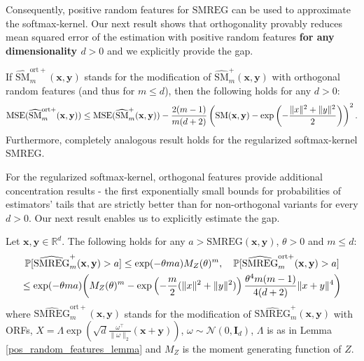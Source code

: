 Consequently, positive random features for $\mathrm{SMREG}$ can be used to approximate the softmax-kernel. Our next result shows that orthogonality provably reduces mean squared error of the estimation with positive random features \textbf{for any dimensionality $d>0$} and we explicitly provide the gap.

\begin{theorem}
\label{var-theorem}
If $\widehat{\mathrm{SM}}_{m}^{\mathrm{ort+}}(\mathbf{x}, \mathbf{y})$ stands for the modification of
$\widehat{\mathrm{SM}}_{m}^{+}(\mathbf{x}, \mathbf{y})$ with orthogonal random features (and thus for $m \leq d$), then the following holds for any $d >0$:
\begin{equation}
\mathrm{MSE}(\widehat{\mathrm{SM}}_{m}^{\mathrm{ort+}}(\mathbf{x}, \mathbf{y})) \leq 
\mathrm{MSE}(\widehat{\mathrm{SM}}_{m}^{+}(\mathbf{x}, \mathbf{y})) - \frac{2 (m - 1)}{m(d+2)}\left(\mathrm{SM}(\mathbf{x}, \mathbf{y}) - \exp\left(- \frac{\| \*x \|^2 + \| \*y \|^2}{2}\right) \right)^2.
\end{equation}
Furthermore, completely analogous result holds for the regularized softmax-kernel $\mathrm{SMREG}$.
\end{theorem}

For the regularized softmax-kernel, orthogonal features provide additional concentration results - the first exponentially small bounds for probabilities of estimators' tails that are strictly better than for non-orthogonal variants for every $d>0$. Our next result enables us to explicitly estimate the gap.

\begin{theorem}
\label{ort-theorem}
Let $\mathbf{x}, \mathbf{y} \in \mathbb{R}^{d}$. The following holds for any $a > \mathrm{SMREG}(\mathbf{x},\mathbf{y})$, $\theta > 0$ and $m \leq d$:
\begin{gather*}
    \mathbb{P}[\widehat{\mathrm{SMREG}}^{+}_{m}(\mathbf{x}, \mathbf{y}) > a] \leq \exp(-\theta m a) M_Z (\theta)^m, \quad \mathbb{P}[\widehat{\mathrm{SMREG}}^{\mathrm{ort+}}_{m}(\mathbf{x}, \mathbf{y}) > a] \\
    \leq \exp(-\theta m a) \biggl( M_Z (\theta)^m - \exp\left(-\frac{m}{2} (\| \*x \|^2 + \| \*y \|^2)\right) \frac{\theta^4 m (m - 1)}{4 (d + 2)} \| \*x + \*y \|^4 \biggr)
\end{gather*}
where $\widehat{\mathrm{SMREG}}^{\mathrm{ort+}}_{m}(\mathbf{x}, \mathbf{y})$ stands for the modification of $\widehat{\mathrm{SMREG}}^{\mathrm{+}}_{m}(\mathbf{x}, \mathbf{y})$ with ORFs, $X = \Lambda \exp(\sqrt{d}\frac{\omega^{\top}}{\|\omega\|_{2}}(\mathbf{x}+\mathbf{y}))$, $\omega \sim \mathcal{N}(0,\mathbf{I}_{d})$, $\Lambda$ is as in Lemma \ref{pos_random_features_lemma} and $M_{Z}$ is the moment generating function of $Z$.
\end{theorem}

